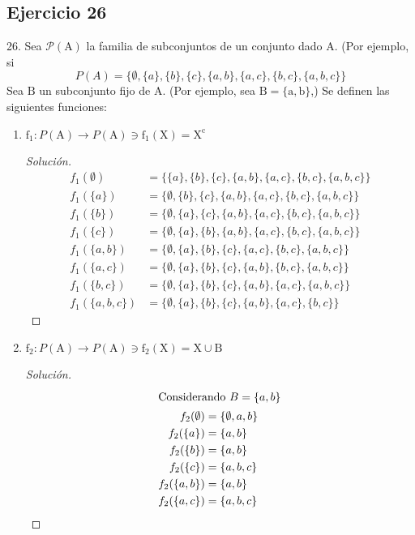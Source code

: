 \documentclass[a4paper,12pt]{article}
\newenvironment{solution}
  {\renewcommand\qedsymbol{$\blacksquare$}\begin{proof}[Solución]}
  {\end{proof}}
\begin{document}
\subsection{Ejercicio 26}
26. Sea $\mathcal{P}(\mathrm{A})$ la familia de subconjuntos de un conjunto dado A. (Por ejemplo, si
$$
P(A)=\{\emptyset,\{a\},\{b\},\{c\},\{a, b\},\{a, c\},\{b, c\},\{a, b, c\}\}
$$
Sea $\mathrm{B}$ un subconjunto fijo de A. (Por ejemplo, sea $\mathrm{B}=\{\mathrm{a}, \mathrm{b}\}$,) Se definen las siguientes funciones:
\begin{enumerate}
\item  $ \mathrm{f}_{1}: P(\mathrm{A}) \rightarrow P(\mathrm{A}) \ni \mathrm{f}_{1}(\mathrm{X})=\mathrm{X}^{\mathrm{c}}
$
\begin{solution}
\begin{align}
    f_1(\emptyset) &=\{\{a\},\{b\},\{c\},\{a, b\},\{a, c\},\{b, c\},\{a, b, c\}\} \\
    f_1(\{a\}) &=\{\emptyset,\{b\},\{c\},\{a, b\},\{a, c\},\{b, c\},\{a, b, c\}\} \\
    f_1(\{b\}) &=\{\emptyset,\{a\},\{c\},\{a, b\},\{a, c\},\{b, c\},\{a, b, c\}\} \\
    f_1(\{c\}) &=\{\emptyset,\{a\},\{b\},\{a, b\},\{a, c\},\{b, c\},\{a, b, c\}\} \\
    f_1(\{a, b\}) &= \{\emptyset,\{a\},\{b\},\{c\},\{a, c\},\{b, c\},\{a, b, c\}\}\\
    f_1(\{a, c\}) &= \{\emptyset,\{a\},\{b\},\{c\},\{a, b\},\{b, c\},\{a, b, c\}\}\\
    f_1(\{b, c\}) &= \{\emptyset,\{a\},\{b\},\{c\},\{a, b\},\{a, c\},\{a, b, c\}\}\\
    f_1(\{a, b, c\}) &=\{\emptyset,\{a\},\{b\},\{c\},\{a, b\},\{a, c\},\{b, c\}\}
\end{align}
\end{solution}
\item  $\mathrm{f}_{2}: P(\mathrm{A}) \rightarrow P(\mathrm{A}) \ni \mathrm{f}_{2}(\mathrm{X})=\mathrm{X} \cup \mathrm{B}$
\begin{solution}
\begin{align}
\intertext{Considerando $B=\{a,b\}$}
    f_2(\emptyset) &= \{\emptyset,a,b\}\\
    f_2(\{a\}) &=\{a,b\} \\
    f_2(\{b\}) &=\{a,b\} \\
    f_2(\{c\}) &=\{a,b,c\} \\
    f_2(\{a, b\}) &=\{a,b\} \\
    f_2(\{a, c\}) &=\{a,b,c\} \\

\end{align}
\end{solution}
\end{enumerate}
\end{document}
